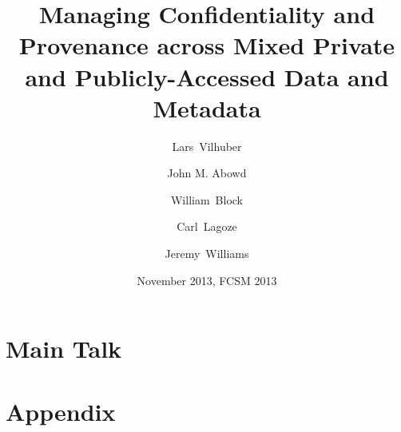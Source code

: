 \documentclass[xcolor=table,compress]{beamer}
\title[Data Management of Confidential Data]{Managing Confidentiality and Provenance across Mixed Private and Publicly-Accessed Data and Metadata}
\author[Vilhuber, Abowd, Block, Lagoze, Williams]{%
  Lars~Vilhuber\inst{1} \and
  John M. Abowd\inst{1} 
  \and William~Block\inst{2}%
  \and Carl~Lagoze\inst{3}%
  \and Jeremy~Williams\inst{2}%
}
\institute[Cornell]{
  \inst{1}%
   Labor Dynamics Institute,
  ILR,
\and \inst{2} Cornell Institute for Social and Economic Research,
\and \inst{3} University of Michigan}%
\date[November 2013]{November 2013,  FCSM 2013}
\begin{document}
\frame{\titlepage}

%


\part<presentation>{Main Talk}

%
%



\part<presentation>{Appendix}



\ifpdf
{}

\fi
\end{document}
